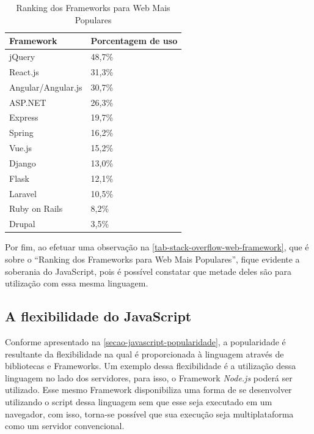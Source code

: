 \begin{table}[htb]
\ABNTEXfontereduzida
\caption[Ranking dos Frameworks para Web Mais Populares]{Ranking dos Frameworks para Web Mais Populares}
\label{tab-stack-overflow-web-framework}
\begin{tabular}{p{5cm}|p{4cm}}
   \textbf{Framework} & \textbf{Porcentagem de uso}  \\
    \hline
    jQuery & 48,7\%  \\
    \hline
    React.js & 31,3\%  \\
    \hline
    Angular/Angular.js & 30,7\%  \\
    \hline
    ASP.NET & 26,3\%  \\
    \hline
    Express & 19,7\%  \\
    \hline
    Spring & 16,2\%  \\
    \hline
    Vue.js & 15,2\%  \\
    \hline
    Django & 13,0\%  \\
    \hline
    Flask & 12,1\%  \\
    \hline
    Laravel & 10,5\%  \\
    \hline
    Ruby on Rails & 8,2\%  \\
    \hline
    Drupal & 3,5\%  \\
\end{tabular}
\end{table}

\newpage
Por fim, ao efetuar uma observação na \autoref{tab-stack-overflow-web-framework}, que é sobre o ``Ranking dos Frameworks para Web Mais Populares'', fique evidente a soberania do JavaScript, pois é possível constatar que metade deles são para utilização com essa mesma linguagem.

\subsection{A flexibilidade do JavaScript}
\label{sec-javascript-flexibilidade}

Conforme apresentado na \autoref{secao-javascript-popularidade}, a popularidade é resultante da flexibilidade na qual é proporcionada à linguagem através de bibliotecas e Frameworks. Um exemplo dessa flexibilidade é a utilização dessa linguagem no lado dos servidores, para isso, o Framework \textit{Node.js} poderá ser utilizado\cite{nodeJsSobre}. Esse mesmo Framework disponibiliza uma forma de se desenvolver utilizando o script dessa linguagem sem que esse seja executado em um navegador, com isso, torna-se possível que sua execução seja multiplataforma como um servidor convencional\cite{nodeJsMDN}.

